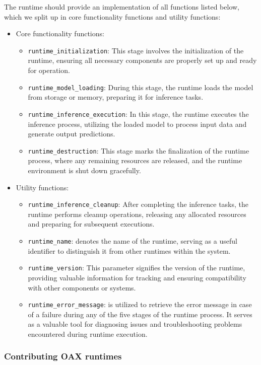 \documentclass{article}
\begin{document}
The runtime should provide an implementation of all functions listed below, which we split up in core functionality functions and utility functions:
\begin{itemize}
	\item Core functionality functions:
	\begin{itemize}
		\item \texttt{runtime\_initialization}: This stage involves the initialization of the runtime, ensuring all necessary components are properly set up and ready for operation.
		\item \texttt{runtime\_model\_loading}: During this stage, the runtime loads the model from storage or memory, preparing it for inference tasks.
		\item \texttt{runtime\_inference\_execution}: In this stage, the runtime executes the inference process, utilizing the loaded model to process input data and generate output predictions.
            \item \texttt{runtime\_destruction}: This stage marks the finalization of the runtime process, where any remaining resources are released, and the runtime environment is shut down gracefully.
	\end{itemize}
	\item Utility functions:
	\begin{itemize}
            \item \texttt{runtime\_inference\_cleanup}: After completing the inference tasks, the runtime performs cleanup operations, releasing any allocated resources and preparing for subsequent executions.
		\item \texttt{runtime\_name}: denotes the name of the runtime, serving as a useful identifier to distinguish it from other runtimes within the system.
		\item \texttt{runtime\_version}: This parameter signifies the version of the runtime, providing valuable information for tracking and ensuring compatibility with other components or systems.
		\item \texttt{runtime\_error\_message}: is utilized to retrieve the error message in case of a failure during any of the five stages of the runtime process. It serves as a valuable tool for diagnosing issues and troubleshooting problems encountered during runtime execution.
	\end{itemize}
\end{itemize}

\subsubsection{Contributing OAX runtimes}
\end{document}
